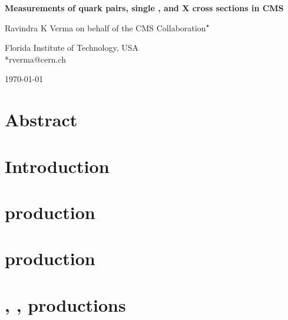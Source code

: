 \documentclass[11pt,twoside,a4paper,cr]{cms-tdr}
\begin{document}


\linenumbers
\begin{center}{\Large \textbf{
Measurements of \PQt quark pairs, single \PQt, and {\ttbar}X cross sections in CMS\\
}}\end{center}
\begin{center}
Ravindra K Verma on behalf of the CMS Collaboration\textsuperscript{$\star$} 
\end{center}
\begin{center}
Florida Institute of Technology, USA 
\\
*rverma@cern.ch 
\end{center}
\begin{center}
\today
\end{center}



\section*{Abstract}


\section{Introduction}
\label{sec:intro}


\section{\texorpdfstring{\ttbar}{ttbar} production}

\label{sec:tt}

\section{\texorpdfstring{\tW}{tW} production} 

\label{sec:tW}

\section{\texorpdfstring{\ttgamma, \ttcc, \ttbb}{ttXX} productions}

\label{sec:ttX}

%


\end{document}
